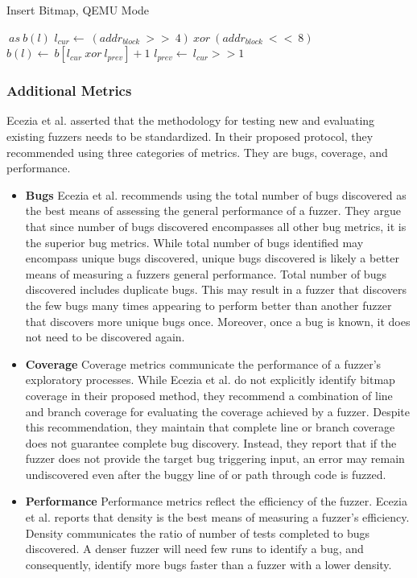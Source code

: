 \begin{algorithm}
    \caption {Insert Bitmap, QEMU Mode}\label{qemu_bitmap}
    \begin{algorithmic}[1]
        $\ as\ b(l)$
                \State $l_{cur} \gets\ (addr_{block}\ >>\ 4)\ xor\ (addr_{block}\ <<\ 8)$
                \State $b(l) \gets\ b[l_{cur}\  xor\  l_{prev}] + 1$
                \State $l_{prev} \gets\ l_{cur} >> 1$
          \EndIf
        \EndProcedure
    \end{algorithmic}
\end{algorithm}

\subsubsection{Additional Metrics}
Ecezia et al. \cite{eceiza_improving_2023} asserted that the methodology for testing new and 
evaluating existing fuzzers needs to be standardized. In their proposed protocol, they 
recommended using three categories of metrics. They are bugs, coverage, and performance. 

\begin{itemize}
    \item \textbf{Bugs} Ecezia et al. recommends using the total number of
    bugs discovered as the best means of assessing the general performance 
    of a fuzzer. They argue that since number of bugs discovered 
    encompasses all other bug metrics, it is the superior bug metrics. 
    While total number of bugs identified may encompass unique bugs 
    discovered, unique bugs discovered is likely a better means of 
    measuring a fuzzers general performance. Total number of bugs 
    discovered includes duplicate bugs. This may result in a fuzzer that 
    discovers the few bugs many times appearing to perform better than 
    another fuzzer that discovers more unique bugs once. Moreover, once a 
    bug is known, it does not need to be discovered again.
    \item \textbf{Coverage} Coverage metrics communicate the performance 
    of a fuzzer's exploratory processes. While Ecezia et al. do not 
    explicitly identify bitmap coverage in their proposed method, they 
    recommend a combination of line and branch coverage for evaluating the 
    coverage achieved by a fuzzer. Despite this recommendation, they 
    maintain that complete line or branch coverage does not guarantee 
    complete bug discovery. Instead, they report that if the fuzzer does 
    not provide the target bug triggering input, an error may remain 
    undiscovered even after the buggy line of or path through code is 
    fuzzed. 
    \item \textbf{Performance} Performance metrics reflect the efficiency 
    of the fuzzer. Ecezia et al. reports that density is the best means of 
    measuring a fuzzer's efficiency. Density communicates the ratio of 
    number of tests completed to bugs discovered. A denser fuzzer will 
    need few runs to identify a bug, and consequently, identify more bugs 
    faster than a fuzzer with a lower density. 
\end{itemize}

